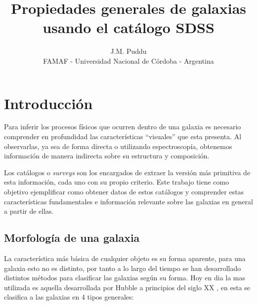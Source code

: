 \documentclass[twocolumn]{article}
\title{Propiedades generales de galaxias usando el catálogo SDSS}
\author{J.M. Puddu \\ FAMAF - Universidad Nacional de Córdoba - Argentina}
\begin{document}

\section{Introducción}

Para inferir los procesos físicos que ocurren dentro de una galaxia es necesario comprender en profundidad las características ``visuales'' que esta presenta. Al observarlas, ya sea de forma directa o utilizando espectroscopía, obtenemos información de manera indirecta sobre su estructura y composición.

Los catálogos o \textit{surveys} son los encargados de extraer la versión más primitiva de esta información, cada uno con su propio criterio. Este trabajo tiene como objetivo ejemplificar como obtener datos de estos catálogos y comprender estas características fundamentales e información relevante sobre las galaxias en general a partir de ellas.


\subsection{Morfología de una galaxia}
La característica más básica de cualquier objeto es su forma aparente, para una galaxia esto no es distinto, por tanto a lo largo del tiempo se han desarrollado distintos métodos para clasificar las galaxias según su forma.
Hoy en dia la mas utilizada es  aquella desarrollada por Hubble a principios del siglo XX \citep{1926ApJ....64..321H}, en esta se clasifica a las galaxias en 4 tipos generales: 
\end{document}
